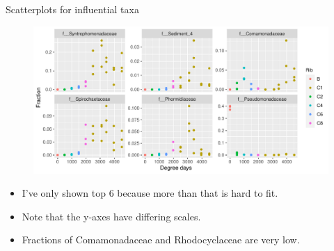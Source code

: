\documentclass{beamer}
\begin{document}
\begin{frame}{Scatterplots for influential taxa}

  \begin{center}
    \begin{figure}
      \includegraphics[width=4.75in]{use_families/w_ribs/w_baseline/infl_rib_family_scatter}
    \end{figure}
  \end{center}
  \vspace{-0.25in}
  {\scriptsize
  \begin{itemize}
  \item I've only shown top 6 because more than that is hard to fit.
  \item Note that the y-axes have differing scales.
  \item Fractions of Comamonadaceae and Rhodocyclaceae are very low.
  \end{itemize}
  }

\end{frame}
\end{document}
